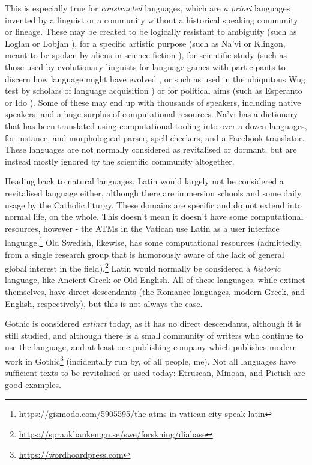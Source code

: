 This is especially true for \textit{constructed} languages, which are \textit{a priori} languages invented by a linguist or a community without a historical speaking community or lineage. These may be created to be logically resistant to ambiguity (such as Loglan or Lobjan \citep{okrent2009land}), for a specific artistic purpose (such as Na'vi or Klingon, meant to be spoken by aliens in science fiction \citep{schreyer2015digital, schreyer2011media}), for scientific study (such as those used by evolutionary linguists for language games with participants to discern how language might have evolved \citep{scott2010language}, or such as used in the ubiquitous Wug test by scholars of language acquisition \citep{ratner2000beginning}) or for political aims (such as Esperanto or Ido \citep{okrent2009land}). Some of these may end up with thousands of speakers, including native speakers, and a huge surplus of computational resources. Na'vi has a dictionary that has been translated using computational tooling into over a dozen languages, for instance, and morphological parser, spell checkers, and a Facebook translator. These languages are not normally considered as revitalised or dormant, but are instead mostly ignored by the scientific community altogether.

Heading back to natural languages, Latin would largely not be considered a revitalised language either, although there are immersion schools and some daily usage by the Catholic liturgy. These domains are specific and do not extend into normal life, on the whole. This doesn't mean it doesn't have some computational resources, however - the ATMs in the Vatican use Latin as a user interface language.\footnote{\href{https://gizmodo.com/5905595/the-atms-in-vatican-city-speak-latin}{https://gizmodo.com/5905595/the-atms-in-vatican-city-speak-latin}} Old Swedish, likewise, has some computational resources (admittedly, from a single research group that is humorously aware of the lack of general global interest in the field).\footnote{\href{https://spraakbanken.gu.se/swe/forskning/diabase}{https://spraakbanken.gu.se/swe/forskning/diabase}} Latin would normally be considered a \textit{historic} language, like Ancient Greek or Old English. All of these languages, while extinct themselves, have direct descendants (the Romance languages, modern Greek, and English, respectively), but this is not always the case.

Gothic is considered \textit{extinct} today, as it has no direct descendants, although it is still studied, and although there is a small community of writers who continue to use the language, and at least one publishing company which publishes modern work in Gothic\footnote{\href{https://wordhoardpress.com}{https://wordhoardpress.com}} (incidentally run by, of all people, me). Not all languages have sufficient texts to be revitalised or used today: Etruscan, Minoan, and Pictish are good examples.


